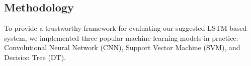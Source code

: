 \documentclass[conference]{IEEEtran}
\begin{document}
\subsection{Methodology}
To provide a trustworthy framework for evaluating our suggested LSTM-based system, we implemented three popular machine learning models in practice: Convolutional Neural Network (CNN), Support Vector Machine (SVM), and Decision Tree (DT). 












\end{document}

